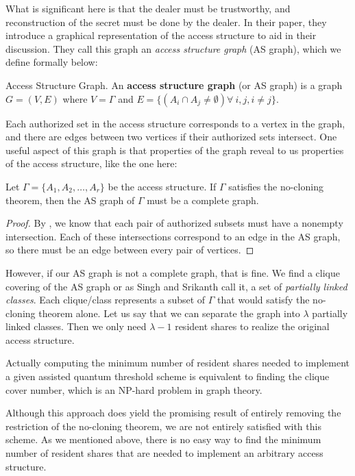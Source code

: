 What is significant here is that the dealer must be trustworthy, and reconstruction of the secret must be done by the dealer. In their paper, they introduce a graphical representation of the access structure to aid in their discussion. They call this graph an \textit{access structure graph} (AS graph), which we define formally below:

\begin{definition}{Access Structure Graph.}
    \label{defn:access-structure-graph}
    An \textbf{access structure graph} (or AS graph) is a graph $G = (V,E)$ where $V = \Gamma$ and $E = \{(A_i \cap A_j \neq \emptyset) \forall\:i,j,i\neq j\}$.
\end{definition}

Each authorized set in the access structure corresponds to a vertex in the graph, and there  are edges between two vertices if their authorized sets intersect. One useful aspect of this graph is that properties of the graph reveal to us properties of the access structure, like the one here:

\begin{proposition}
    \label{prop:complete-as-graph}
    Let $\Gamma = \{A_1,A_2,\dots,A_r\}$ be the access structure. If $\Gamma$ satisfies the no-cloning theorem, then the AS graph of $\Gamma$ must be a complete graph.
\end{proposition}

\begin{proof}
    By , we know that each pair of authorized subsets must have a nonempty intersection. Each of these intersections correspond to an edge in the AS graph, so there must be an edge between every pair of vertices.
\end{proof}

However, if our AS graph is not a complete graph, that is fine. We find a clique covering of the AS graph or as Singh and Srikanth call it, a set of \textit{partially linked classes}. Each clique/class represents a subset of $\Gamma$ that would satisfy the no-cloning theorem alone. Let us say that we can separate the graph into $\lambda$ partially linked classes. Then we only need $\lambda - 1$ resident shares to realize the original access structure. 

Actually computing the minimum number of resident shares needed to implement a given assisted quantum threshold scheme is equivalent to finding the clique cover number, which is an NP-hard problem in graph theory.

Although this approach does yield the promising result of entirely removing the restriction of the no-cloning theorem, we are not entirely satisfied with this scheme. As we mentioned above, there is no easy way to find the minimum number of resident shares that are needed to implement an arbitrary access structure.

